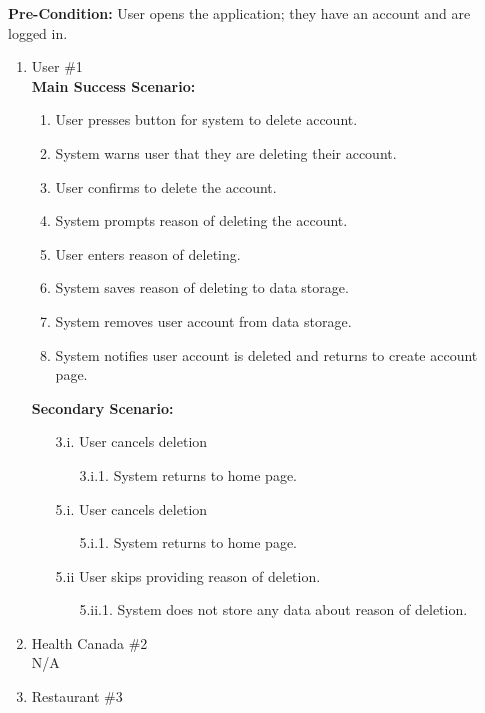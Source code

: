 \documentclass[]{article}
\begin{document}
\begin{enumerate}[{\bf BE1.}]
	\textbf{Pre-Condition:} User opens the application; they have an account and are logged in.
		\begin{enumerate}[{\bf VP1.}]
			\item User \#1 \\
				\textbf{Main Success Scenario:} 
				\begin{enumerate}[{1.}]
					\item User presses button for system to delete account.
					\item System warns user that they are deleting their account.
					\item User confirms to delete the account.
					\item System prompts reason of deleting the account.
					\item User enters reason of deleting.
					\item System saves reason of deleting to data storage.
					\item System removes user account from data storage.
					\item System notifies user account is deleted and returns to create account page.
				\end{enumerate}
				\textbf{Secondary Scenario:}
				\begin{enumerate}
					\item[3.i.] User cancels deletion
					\begin{enumerate}
						\item[3.i.1.] System returns to home page. 
					\end{enumerate}
				\end{enumerate}
				\begin{enumerate}
					\item[5.i.] User cancels deletion
					\begin{enumerate}
						\item[5.i.1.] System returns to home page. 
					\end{enumerate}
					\item [5.ii] User skips providing reason of deletion.
					\begin{enumerate}
						\item[5.ii.1.] System does not store any data about reason of deletion.
					\end{enumerate}
				\end{enumerate}
			\item Health Canada  \#2 \\
				N/A
			\item Restaurant \#3 \\

\end{enumerate}
\end{enumerate}
\end{document}
